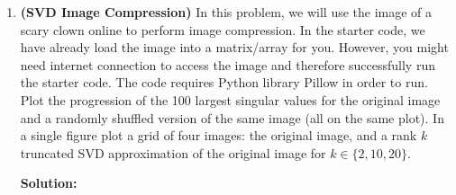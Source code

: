 \documentclass[letter,11pt]{article}
\newenvironment{solution}{
    \vspace{0.16in} {\bf Solution:}
    
}{
	\vspace{0.16in}
}
\newcommand{\xx}{\bm{x}}
\newcommand{\mub}{\bm{\mu}}
\newcommand{\Sigmab}{\bm{\Sigma}}
\begin{document}
\begin{enumerate}
\begin{solution}
        Performing the same steps to maximise $\Sigmab_k$,
        \begin{align*}
            \dv{\ell}{\Sigmab_k} &= \dv{\Sigmab_k} \left(-\frac{1}{2}\sum_i r_{ik}\log|\Sigmab_k| + r_{ik}(\xx_i - \mub_k)^T\Sigmab_k^{-1}(\xx_i - \mub_k)\right) \\
                                 &= -\frac{1}{2}\sum_i \left(r_{ik}\Sigmab_k^{-1} - r_{ik}\Sigmab_k^{-1}(\xx_i - \mub_k)(\xx_i - \mub_k)^T\Sigmab_k^{-1}\right) \\
            0 &= -\frac{1}{2}\sum_i \left(r_{ik}\Sigmab_k^{-1} - r_{ik}\Sigmab_k^{-1}(\xx_i - \mub_k)(\xx_i - \mub_k)^T\Sigmab_k^{-1}\right) \\
            \sum_i r_{ik}\Sigmab_k^{-1} &= \sum_i r_{ik}\Sigmab_k^{-1}(\xx_i - \mub_k)(\xx_i - \mub_k)^T\Sigmab_k^{-1} \\
            r_k\bm{I} &= \sum_i r_{ik} (\xx_i - \mub_k)(\xx_i - \mub_k)^T\Sigmab_k^{-1} \\
            \Sigmab_k &= \frac{1}{r_k} \sum_i r_{ik}(\xx_i - \mub_k)(\xx_i - \mub_k)^T \\
                      &= \frac{1}{r_k} \sum_i r_{ik}(\xx_i \xx_i^T) - r_k\mub_k\mub_k^T, \quad\quad \text{yielding the correct answer.}
        \end{align*}
    \end{solution}

    \newpage


    \item \textbf{(SVD Image Compression)} In this problem, we will use the image of a scary clown online to perform image compression.  In the starter code, we have already load the image into a matrix/array for you. However, you might need internet connection to access the image and therefore successfully run the starter code. The code requires Python library Pillow in order to run. \\

    Plot the progression of the 100 largest singular values for the original image and a randomly shuffled version of the same image (all on the same plot). In a single figure plot a grid of four images: the original image, and a rank $k$ truncated SVD approximation of the original image for $k\in\{2,10,20\}$.

    \begin{solution}
        
    \end{solution}
\end{enumerate}
\end{document}
